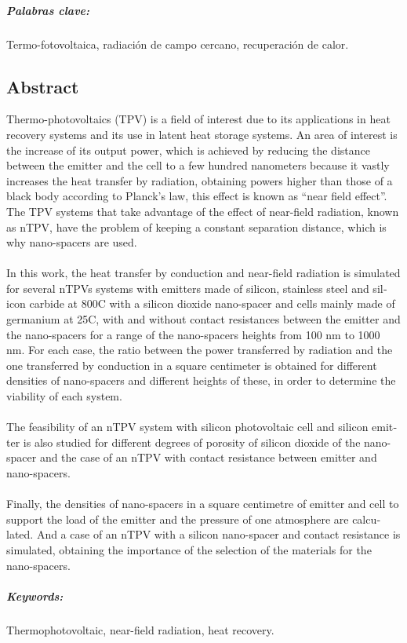 
\paragraph{Palabras clave:} Termo-fotovoltaica, radiación de campo cercano, recuperación de calor.
\begin{otherlanguage}{british}
\chapter{Abstract}

Thermo-photovoltaics (TPV) is a field of interest due to its applications in heat recovery systems and its use in latent heat storage systems. An area of interest is the increase of its output power, which is achieved by reducing the distance between the emitter and the cell to a few hundred nanometers because it vastly increases the heat transfer by radiation, obtaining powers higher than those of a 
black body according to Planck's law, this effect is known as ``near field effect''. The TPV systems that take advantage of the effect of near-field radiation, known as nTPV, have the problem of keeping a constant separation distance, which is why nano-spacers are used.\\\\
%
In this work, the heat transfer by conduction and near-field radiation is simulated for several nTPVs systems with emitters made of silicon, stainless steel and silicon carbide at 800\textdegree C with a silicon dioxide nano-spacer and cells mainly made of germanium at 25\textdegree C, with and without contact resistances between the emitter and the nano-spacers for a range of the nano-spacers heights from 100 nm to 1000 nm. For each case, the ratio between the power transferred by radiation and the one transferred by conduction in a square centimeter is obtained for different densities of nano-spacers and different heights of these, in order to determine the viability of each system.\\\\
%
The feasibility of an nTPV system with silicon photovoltaic cell and silicon emitter is also studied for different degrees of porosity of silicon dioxide of the nano-spacer and the case of an nTPV with contact resistance between emitter and nano-spacers.\\\\
%
Finally, the densities of nano-spacers in a square centimetre of emitter and cell to support the load of the emitter and the pressure of one atmosphere are calculated. And a case of an nTPV with a silicon nano-spacer and contact resistance is simulated, obtaining the importance of the selection of the materials for the nano-spacers.

\paragraph{Keywords:} Thermophotovoltaic, near-field radiation, heat recovery.
\end{otherlanguage}